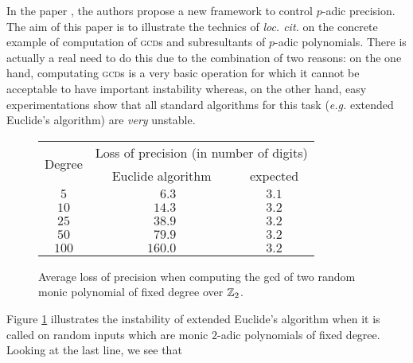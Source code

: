 \documentclass{article}
\begin{document}
In the paper \cite{padicprec}, the authors propose a new framework to control 
$p$-adic precision. The aim of this paper is to illustrate the technics 
of \emph{loc. cit.} on the concrete example of computation of 
\textsc{gcd}s and subresultants of $p$-adic polynomials. There is 
actually a real need to do this due to the combination of two reasons: on 
the one hand, computating \textsc{gcd}s is a very basic operation for 
which it cannot be acceptable to have important instability whereas, on 
the other hand, easy experimentations show that all standard algorithms 
for this task (\emph{e.g.} extended Euclide's algorithm) are \emph{very} 
unstable.
%
\begin{figure}
\renewcommand{\arraystretch}{1.2}
\begin{center}
\begin{tabular}{|c||c|c|}
\hline
\multirow{2}{*}{\hspace{0.2cm}Degree\hspace{0.2cm}\null} & 
\multicolumn{2}{c|}{\hspace{0.3cm}Loss of precision (in number of digits)\hspace{0.3cm}\null}\\
\cline{2-3}
& \hspace{0.3cm}Euclide algorithm\hspace{0.3cm}\null & expected \\
\hline
$5$ & $\phantom{00}6.3$ & $3.1$ \\
$10$ & $\phantom{0}14.3$ & $3.2$ \\
$25$ & $\phantom{0}38.9$ & $3.2$ \\
$50$ & $\phantom{0}79.9$ & $3.2$ \\
$100$ & $160.0$ & $3.2$ \\
\hline
\end{tabular}
\end{center}

\vspace{-0.3cm}

\caption{Average loss of precision when computing the {\sc gcd}
of two random monic polynomial of fixed degree over $\mathbb Z_2$.}
\label{fig:precision}

\vspace{-0.3cm}
\end{figure}
%
Figure \ref{fig:precision} illustrates the instability of extended Euclide's 
algorithm when it is called on random inputs which are monic $2$-adic 
polynomials of fixed degree.  Looking at the last line, we see that 
\end{document}
